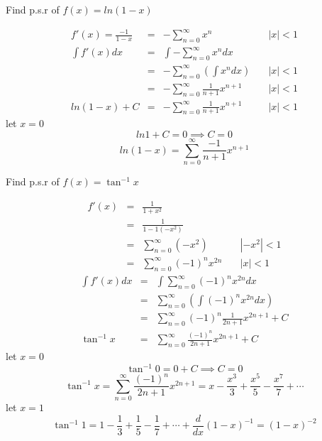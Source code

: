 \begin{eg}
Find p.s.r of \(\displaystyle f(x) = ln(1 - x)\)

\soln
\[\begin{array}{lcll}
\displaystyle f'(x) = \frac{-1}{1 - x} & = & \displaystyle - \sum^{\infty}_{n = 0} x^n & \quad |x|< 1\\
\displaystyle \int f'(x)dx & = & \displaystyle \int - \sum^{\infty}_{n = 0} x^n dx\\
& = & \displaystyle - \sum^{\infty}_{n = 0} (\int x^n dx) & \quad |x| < 1\\
& = & \displaystyle - \sum^{\infty}_{n = 0} \frac{1}{n + 1}x^{n + 1} & \quad |x| < 1\\
\displaystyle ln(1 - x) + C & = & \displaystyle - \sum^{\infty}_{n = 0} \frac{1}{n + 1} x^{n + 1} & \quad |x| < 1
\end{array}\]
let \( x = 0\)
\[\displaystyle ln 1 + C = 0 \implies C = 0\]
\[\displaystyle ln (1 - x) = \sum^{\infty}_{n = 0} \frac{-1}{n + 1} x^{n + 1}\]
\end{eg}
\begin{eg}
Find p.s.r of \(f(x) = \tan^{-1} x\)

\soln
\[\begin{array}{rcll}
\displaystyle f'(x) & = &\displaystyle \frac{1}{1 + x^2}\\
& = & \displaystyle \frac{1}{1 - 1(-x^2)}\\
& = & \displaystyle \sum^{\infty}_{n = 0} (-x^2) & \quad |-x^2| < 1\\
& = & \displaystyle \sum^{\infty}_{n = 0} ( -1)^n x^{2n} & \quad |x|< 1
\end{array}\]
\[\begin{array}{lcl}
\displaystyle \int f'(x) dx & = & \displaystyle \int \sum^{\infty}_{n = 0} (-1)^n x^{2n} dx\\
& = & \displaystyle \sum^{\infty}_{n = 0} (\int (-1)^n x^{2n} dx)\\
& = & \displaystyle \sum^{\infty}_{n = 0} (-1)^n \frac{1}{2n + 1} x^{2n + 1} + C\\
\displaystyle \tan^{-1} x & = & \displaystyle \sum^{\infty}_{n = 0} \frac{(-1)^n}{2n + 1} x^{2n + 1} + C
\end{array}\]
let \(x = 0\)
\[\displaystyle \tan^{-1} 0 = 0 + C \implies C = 0\]
\[\displaystyle \tan^{-1} x = \sum^{\infty}_{n = 0} \frac{(-1)^n}{2n + 1} x^{2n + 1} = x - \frac{x^3}{3} + \frac{x^5}{5} - \frac{x^7}{7} + \cdots\]
let \(x = 1\)
\[\displaystyle \tan^{-1} 1 = 1 - \frac{1}{3}  + \frac{1}{5} - \frac{1}{7} + \cdots + \frac{d}{dx} (1 - x)^{-1} = ( 1 - x)^{-2}\]
\end{eg}
